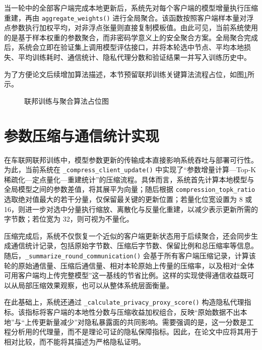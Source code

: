 当一轮中的全部客户端完成本地更新后，系统先对每个客户端的模型增量执行压缩重建，再由 \texttt{aggregate\_weights()} 进行全局聚合。该函数按照客户端样本量对浮点参数执行加权平均，对非浮点张量则直接复制模板值。由此可见，当前系统使用的是基于样本权重的参数聚合，而非密码学意义上的安全聚合方案。全局聚合完成后，系统会立即在验证集上调用模型评估接口，并将本轮选中节点、平均本地损失、平均训练耗时、通信统计、隐私代理分数和验证结果一并写入训练历史中。

为了方便论文后续增加算法描述，本节预留联邦训练关键算法流程占位，如图\ref{fig:federated-algorithm-placeholder}所示。

\begin{figure}[htbp]
    \centering
    \caption{联邦训练与聚合算法占位图}
    \label{fig:federated-algorithm-placeholder}
\end{figure}

\section{参数压缩与通信统计实现}
\label{sec:implementation-communication}

在车联网联邦训练中，模型参数更新的传输成本直接影响系统吞吐与部署可行性。为此，当前系统在 \texttt{\_compress\_client\_update()} 中实现了“参数增量计算—Top-K 稀疏化—定点量化—重建统计”的压缩流程。具体而言，系统首先计算本地模型与全局模型之间的参数差值，将其展平为向量；随后根据 \texttt{compression\_topk\_ratio} 选取绝对值最大的若干分量，仅保留最关键的更新位置；若量化位宽设置为 8 或 16，则进一步对选中分量执行缩放、离散化与反量化重建，以减少表示更新所需的字节数；若位宽为 32，则可视为不量化。

压缩完成后，系统不仅恢复一个近似的客户端更新状态用于后续聚合，还会同步生成通信统计记录，包括原始字节数、压缩后字节数、保留比例和总压缩率等信息。随后，\texttt{\_summarize\_round\_communication()} 会基于所有客户端压缩记录，计算该轮的原始通信量、压缩后通信量、相对本轮原始上传量的压缩率，以及相对“全体可用客户端均上传完整模型”这一基线的节省比例。这样的实现使得通信收益既可以从局部压缩效果观察，也可以从整体系统层面衡量。

在此基础上，系统还通过 \texttt{\_calculate\_privacy\_proxy\_score()} 构造隐私代理指标。该指标将客户端的本地性分数与压缩收益加权组合，反映“原始数据不出本地”与“上传更新量减少”对隐私暴露面的共同影响。需要强调的是，这一分数是工程分析用的代理量，而不是理论可证的隐私保障指标。因此，在论文中应将其用于相对比较，而不能将其描述为严格隐私证明。

